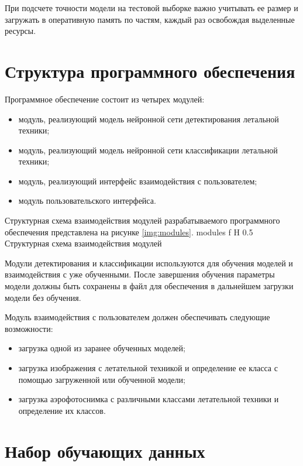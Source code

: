 При подсчете точности модели на тестовой выборке важно учитывать ее размер и загружать в оперативную память по частям, каждый раз освобождая выделенные ресурсы.

\section{Структура программного обеспечения}

Программное обеспечение состоит из четырех модулей:
\begin{itemize}
	\item модуль, реализующий модель нейронной сети детектирования летальной техники;
	\item модуль, реализующий модель нейронной сети классификации летальной техники;
	\item модуль, реализующий интерфейс взаимодействия с пользователем;
	\item модуль пользовательского интерфейса.
\end{itemize}

Структурная схема взаимодействия модулей разрабатываемого программного обеспечения представлена на рисунке \ref{img:modules}.
{modules} %
{f} %
{H} %
{0.5\textwidth} %
{Структурная схема взаимодействия модулей} %

Модули детектирования и классификации используются для обучения моделей и взаимодействия с уже обученными. После завершения обучения параметры модели должны быть сохранены в файл для обеспечения в дальнейшем загрузки модели без обучения.

Модуль взаимодействия с пользователем должен обеспечивать следующие возможности:
\begin{itemize}
	\item загрузка одной из заранее обученных моделей;
	\item загрузка изображения с летательной техникой и определение ее класса с помощью загруженной или обученной модели;
	\item загрузка аэрофотоснимка с различными классами летательной техники и определение их классов.
\end{itemize} 

\section{Набор обучающих данных}

